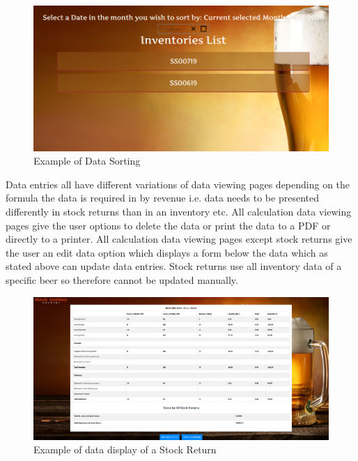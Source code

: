 \begin{figure}[h!]
 	\caption{Example of Data Sorting}
	\label{image:datasorting}
 	\centering
 	\includegraphics[width=1\textwidth]{Images/sorting.PNG}
\end{figure}
\newpage
Data entries all have different variations of data viewing pages depending on the formula the data is required in by revenue i.e. data needs to be presented differently in stock returns than in an inventory etc. All calculation data viewing pages give the user options to delete the data or print the data to a PDF or directly to a printer. All calculation data viewing pages except stock returns give the user an edit data option which displays a form below the data which as stated above can update data entries. Stock returns use all inventory data of a specific beer so therefore cannot be updated manually. 

\begin{figure}[h!]
 	\caption{Example of data display of a Stock Return}
	\label{image:datadisplay}
 	\centering
 	\includegraphics[width=1\textwidth]{Images/dataexample2.PNG}
\end{figure}
\newpage


